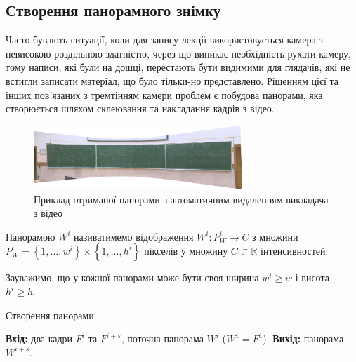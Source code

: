 \subsection{Створення панорамного знімку}

Часто бувають ситуації, коли для запису лекції використовується камера з
невисокою роздільною здатністю, через що виникає необхідність рухати
камеру, тому написи, які були на дошці, перестають бути видимими для
глядачів, які не встигли записати матеріал, що було тільки-но
представлено. Рішенням цієї та інших пов'язаних з тремтінням
камери проблем є побудова панорами, яка створюється шляхом склеювання
та накладання кадрів з відео.

\begin{figure}[H]
    \centering
    \includegraphics[width=0.7\textwidth]{images/panorama_example}
    \caption{Приклад отриманої панорами з автоматичним видаленням
        викладача з відео \cite{fpmi_2021_video}
        \label{fig:panorama_example}
    }
\end{figure}

\begin{definition}
    Панорамою \(W^{i}\) називатимемо відображення
    \(W^{i}:P_{W}^{i} \rightarrow C\) з множини
    \(P_{W}^{i} = \left\{ 1,\ldots,w^{i} \right\} \times \left\{ 1,\ldots,h^{i} \right\}\)
    пікселів у множину \(C\mathbb{\subset R}\) інтенсивностей.
\end{definition}

Зауважимо, що
у кожної панорами може бути своя ширина \(w^{i} \geq w\) і висота
\(h^{i} \geq h\).

\begin{algorithm}[H]
    \caption{Створення панорами}
    \label{al:panorama_creating_algorithm}
    \begin{algorithmic}
        \State \textbf{Вхід:} два кадри \(F^{i}\) та \(F^{i + s}\), поточна панорама \(W^{i}\) (\(W^{1} = F^{1}\)).
        \State \textbf{Вихід:} панорама \(W^{i + s}\).
    \end{algorithmic}
\end{algorithm}

